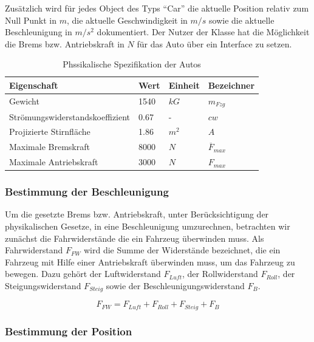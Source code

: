 \documentclass[12pt,a4paper,bibliography=totocnumbered,listof=totocnumbered, abstracton]{scrartcl}
\theoremstyle{Umgebung}
\begin{document}
Zusätzlich wird für jedes Object des Typs \enquote{Car} die aktuelle Position relativ zum Null Punkt in $m$, die aktuelle Geschwindigkeit in $m/s$ sowie  die aktuelle Beschleunigung in $m/s^2$ dokumentiert. Der Nutzer der Klasse hat die Möglichkeit die Brems bzw. Antriebskraft in $N$ für das Auto über ein Interface zu setzen.

\begin{table}[]
	\centering
	\caption{Phssikalische Spezifikation der Autos}
	\label{table:car}
	\begin{tabular}{@{}llll@{}}
		\toprule
		Eigenschaft                     & Wert & Einheit 	& Bezeichner            \\ \midrule
		Gewicht                         & 1540 & $kG$ 		& $m_{Fzg}$                 \\
		Strömungswiderstandskoeffizient & 0.67 & -          & $cw$         \\
		Projizierte Stirnfläche         & 1.86 & $m^2$ 		& $A$\\ 
		Maximale Bremskraft             & 8000 & $N$        & $\overline{F}_{max}$         \\
		Maximale Antriebskraft			& 3000 & $N$        & $ {F}_{max} $          \\ \bottomrule
	\end{tabular}
\end{table}

\subsubsection{Bestimmung der Beschleunigung}

Um die gesetzte Brems bzw. Antriebskraft, unter Berücksichtigung der physikalischen Gesetze, in eine Beschleunigung umzurechnen, betrachten wir zunächst die Fahrwiderstände die ein Fahrzeug überwinden muss. Als Fahrwiderstand $F_{FW}$ wird die Summe der Widerstände bezeichnet, die ein Fahrzeug mit Hilfe einer Antriebskraft überwinden muss, um das Fahrzeug zu bewegen. Dazu gehört der Luftwiderstand $F_{Luft}$, der Rollwiderstand $F_{Roll}$, der Steigungswiderstand $F_{Steig}$ sowie der Beschleunigungswiderstand $F_{B}$.

\begin{equation}
F_{FW} = F_{Luft} + F_{Roll} + F_{Steig} + F_{B}
\end{equation}


\subsubsection{Bestimmung der Position}
\end{document}

